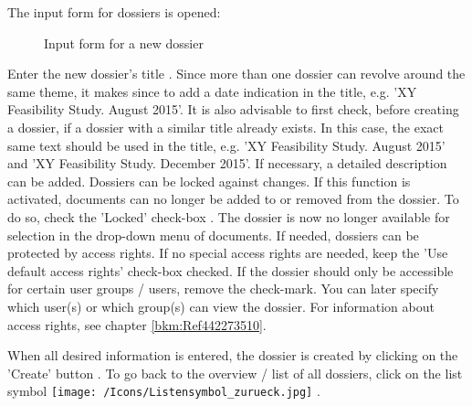 \vspace{\baselineskip}

The input form for dossiers is opened:

\begin{figure}[H]
\caption{Input form for a new dossier}
\end{figure}

Enter the new dossier's title . Since more than one dossier can revolve around the same theme, it makes since to add a date indication in the title, e.g. 'XY Feasibility Study. August 2015'. It is also advisable to first check, before creating a dossier, if a dossier with a similar title already exists. In this case, the exact same text should be used in the title, e.g. 'XY Feasibility Study. August 2015' and 'XY Feasibility Study. December 2015'. If necessary, a detailed description  can be added. Dossiers can be locked against changes. If this function is activated, documents can no longer be added to or removed from the dossier. To do so, check the 'Locked' check-box . The dossier is now no longer available for selection in the drop-down menu of documents. If needed, dossiers can be protected by access rights. If no special access rights are needed, keep the 'Use default access rights' check-box  checked. If the dossier should only be accessible for certain user groups / users, remove the check-mark. You can later specify which user(s) or which group(s) can view the dossier. For information about access rights, see chapter \ref{bkm:Ref442273510}. \newline

When all desired information is entered, the dossier is created by clicking on the 'Create' button . To go back to the overview / list of all dossiers, click on the list symbol \texttt{[image: /Icons/Listensymbol\_zurueck.jpg]} .

